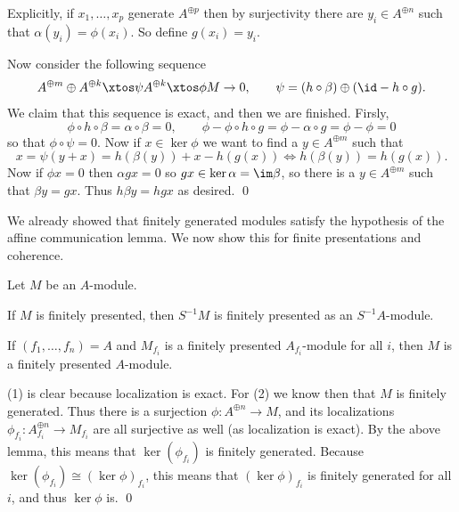 
    Explicitly, if $x_1,\dots,x_p$ generate $A^{\oplus p}$ then by surjectivity there are $y_i\in A^{\oplus n}$ such that $\alpha(y_i)=\phi(x_i)$.
    So define $g(x_i)=y_i$.

    Now consider the following sequence
    $$ A^{\oplus m}\oplus A^{\oplus k} \xtos\psi A^{\oplus k} \xtos\phi M \to 0,\qquad \psi = (h\circ\beta)\oplus(\id-h\circ g) . $$
    We claim that this sequence is exact, and then we are finished.
    Firsly,
    $$ \phi\circ h\circ\beta = \alpha\circ\beta = 0,\qquad \phi - \phi\circ h\circ g = \phi - \alpha\circ g = \phi - \phi = 0 $$
    so that $\phi\circ\psi=0$.
    Now if $x\in\ker\phi$ we want to find a $y\in A^{\oplus m}$ such that
    $$ x = \psi(y+x) = h(\beta(y)) + x - h(g(x)) \iff h(\beta(y)) = h(g(x)) . $$
    Now if $\phi x=0$ then $\alpha gx=0$ so $gx\in\ker\alpha=\im\beta$, so there is a $y\in A^{\oplus m}$ such that $\beta y=gx$.
    Thus $h\beta y=hgx$ as desired.
    \qed

\eproof

We already showed that finitely generated modules satisfy the hypothesis of the affine communication lemma.
We now show this for finite presentations and coherence.

\blemm

    Let $M$ be an $A$-module.
    \benum
        \item If $M$ is finitely presented, then $S^{-1}M$ is finitely presented as an $S^{-1}A$-module.
        \item If $(f_1,\dots,f_n)=A$ and $M_{f_i}$ is a finitely presented $A_{f_i}$-module for all $i$, then $M$ is a finitely presented $A$-module.
    \eenum

\elemm

\bproof

    (1) is clear because localization is exact.
    For (2) we know then that $M$ is finitely generated.
    Thus there is a surjection $\phi\colon A^{\oplus n}\to M$, and its localizations $\phi_{f_i}\colon A_{f_i}^{\oplus n}\to M_{f_i}$ are all surjective as well (as localization is exact).
    By the above lemma, this means that $\ker(\phi_{f_i})$ is finitely generated.
    Because $\ker(\phi_{f_i})\cong(\ker\phi)_{f_i}$, this means that $(\ker\phi)_{f_i}$ is finitely generated for all $i$, and thus $\ker\phi$ is.
    \qed

